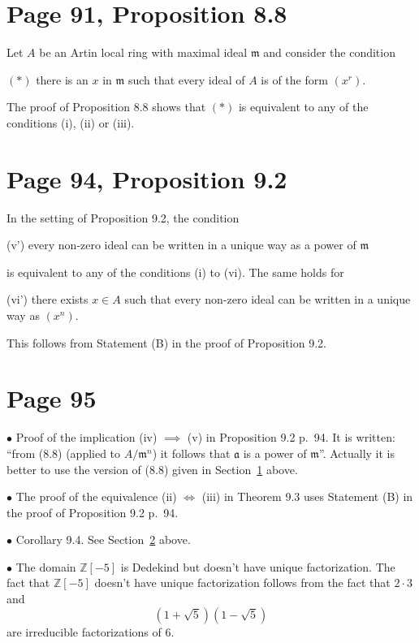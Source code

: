 \documentclass[12pt]{article}
\newcommand{\mf}{\mathfrak}
\newcommand{\bu}{\bullet}
\begin{document}
\section{Page 91, Proposition 8.8}\label{88}%

Let $A$ be an Artin local ring with maximal ideal $\mf m$ and consider the condition

$(*)$ there is an $x$ in $\mf m$ such that every ideal of $A$ is of the form $(x^r)$. 

The proof of Proposition 8.8 shows that $(*)$ is equivalent to any of the conditions (i), (ii) or (iii).

\section{Page 94, Proposition 9.2}\label{92}%

In the setting of Proposition 9.2, the condition

(v') every non-zero ideal can be written in a unique way as a power of $\mf m$

 is equivalent to any of the conditions (i) to (vi). The same holds for

(vi') there exists $x\in A$ such that every non-zero ideal can be written in a unique way as $(x^n)$.

This follows from Statement (B) in the proof of Proposition 9.2.

\section{Page 95}%

$\bu$ Proof of the implication (iv) $\implies$ (v) in Proposition 9.2 p.~94. It is written: ``from (8.8) (applied to $A/\mf m^n$) it follows that $\mf a$ is a power of $\mf m$''. Actually it is better to use the version of (8.8) given in Section~\ref{88} above.


$\bu$ The proof of the equivalence (ii) $\iff$ (iii) in Theorem 9.3 uses Statement (B) in the proof of Proposition 9.2 p.~94.

$\bu$ Corollary 9.4. See Section~\ref{92} above.

$\bu$ The domain $\mathbb Z[-5]$ is Dedekind but doesn't have unique factorization. %
The fact that $\mathbb Z[-5]$ doesn't have unique factorization follows from the fact that $2\cdot3$ and $$\left(1+\sqrt5\right)\left(1-\sqrt5\right)$$ are irreducible factorizations of $6$.%
\end{document}
